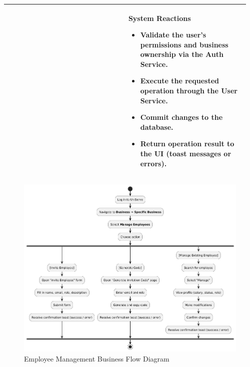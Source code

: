 \documentclass[]{VUMIFTemplateClass}
\newenvironment{mpitemlist}[1][\linewidth]{%
    \begin{minipage}[t]{#1}%
        \setlength{\leftmargini}{12pt}%
        \begin{itemize}%
            \setlength{\itemsep}{1pt}%
            \setlength{\parskip}{0pt}%
            \setlength{\parsep}{0pt}%
}{%
        \end{itemize}%
    \end{minipage}\newline
}
\begin{document}
\begin{center}
\begin{tabular}{|p{0.48\linewidth}|p{0.48\linewidth}|}
\begin{mpitemlist}
\end{mpitemlist}
&
\textbf{System Reactions} \newline
\begin{mpitemlist}
\item Validate the user’s permissions and business ownership via the Auth Service.
\item Execute the requested operation through the User Service.
\item Commit changes to the database.
\item Return operation result to the UI (toast messages or errors).
\end{mpitemlist}
\\ \hline
\end{tabular}
\end{center}


\begin{figure}[H]
    \centering
    \includegraphics[width=1\textwidth]{docs/ps-design/design-document/images/diagrams/business/bpmn_user_manage.png}
    \caption{Employee Management Business Flow Diagram}
    \label{fig:user_manage_flow}
\end{figure}
\end{document}
